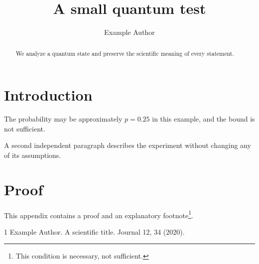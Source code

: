 \documentclass{article}
\title{A small quantum test}
\author{Example Author}
\begin{document}
\maketitle
\begin{abstract}
We analyze a quantum state and preserve the scientific meaning of every statement.
\end{abstract}
\section{Introduction}
The probability may be approximately $p=0.25$ in this example, and the bound is not sufficient.

A second independent paragraph describes the experiment without changing any of its assumptions.

\appendix
\section{Proof}
This appendix contains a proof and an explanatory footnote\footnote{This condition is necessary, not sufficient.}.
\begin{thebibliography}{1}
 Example Author. A scientific title. Journal 12, 34 (2020).
\end{thebibliography}
\end{document}
